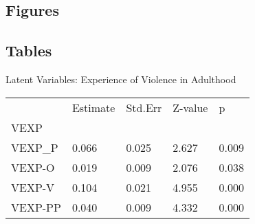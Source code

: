 \documentclass[utf8]{frontiersSCNS} %
\begin{document}

\subsection{Figures}


\subsection{Tables}

Latent Variables: Experience of Violence in Adulthood
\begin{table}[]
\begin{tabular}{lllll}
        & Estimate & Std.Err & Z-value & p     \\
VEXP    &          &         &         &       \\
VEXP\_P & 0.066    & 0.025   & 2.627   & 0.009 \\
VEXP-O  & 0.019    & 0.009   & 2.076   & 0.038 \\
VEXP-V  & 0.104    & 0.021   & 4.955   & 0.000 \\
VEXP-PP & 0.040    & 0.009   & 4.332   & 0.000
\end{tabular}
\end{table}
\end{document}
